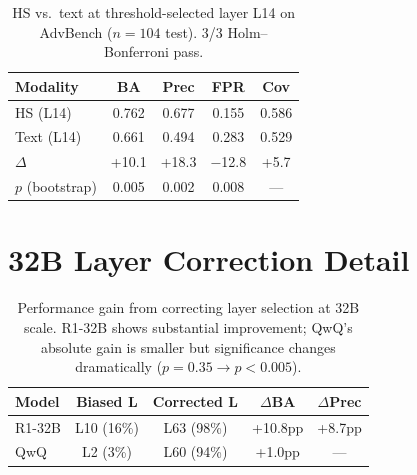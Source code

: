 \documentclass[11pt]{article}
\begin{document}
\begin{table}[t]
\centering
\small
\begin{tabular}{@{}lcccc@{}}
\toprule
\textbf{Modality} & \textbf{BA} & \textbf{Prec} & \textbf{FPR} & \textbf{Cov} \\
\midrule
HS (L14) & 0.762 & 0.677 & 0.155 & 0.586 \\
Text (L14) & 0.661 & 0.494 & 0.283 & 0.529 \\
$\Delta$ & +10.1 & +18.3 & $-$12.8 & +5.7 \\
$p$ (bootstrap) & 0.005 & 0.002 & 0.008 & --- \\
\bottomrule
\end{tabular}
\caption{HS vs.\ text at threshold-selected layer L14 on AdvBench ($n{=}104$ test). 3/3 Holm--Bonferroni pass.}
\label{tab:advbench-hs-text}
\end{table}


\section{32B Layer Correction Detail}
\label{app:32b-correction}

\begin{table}[t]
\centering
\small
\begin{tabular}{@{}lcccc@{}}
\toprule
\textbf{Model} & \textbf{Biased L} & \textbf{Corrected L} & $\Delta$\textbf{BA} & $\Delta$\textbf{Prec} \\
\midrule
R1-32B & L10 (16\%) & L63 (98\%) & +10.8pp & +8.7pp \\
QwQ & L2 (3\%) & L60 (94\%) & +1.0pp & --- \\
\bottomrule
\end{tabular}
\caption{Performance gain from correcting layer selection at 32B scale. R1-32B shows substantial improvement; QwQ's absolute gain is smaller but significance changes dramatically ($p{=}0.35 \to p{<}0.005$).}
\label{tab:32b-correction}
\end{table}
\end{document}
